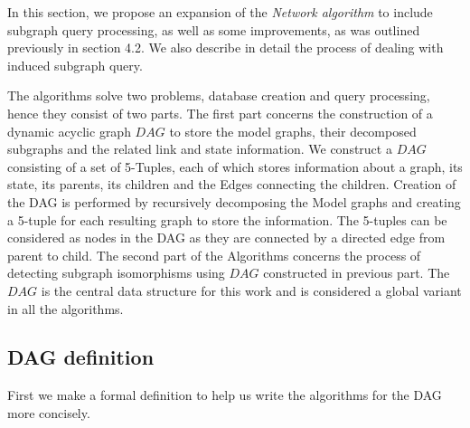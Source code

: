In this section, we propose an expansion of the \textit{Network algorithm} to include subgraph query processing, as well as some improvements, as was outlined previously in section 4.2. We also describe in detail the process of dealing with induced subgraph query.


The algorithms solve two problems, database creation and query processing, hence they consist of two parts. The first part concerns the construction of a dynamic acyclic graph $DAG$ to store the model graphs, their decomposed subgraphs and the related link and state information. We construct a $DAG$ consisting of a set of 5-Tuples, each of which  stores information about a graph, its state, its parents, its children and the Edges connecting the children. Creation of the DAG is performed by recursively decomposing the Model graphs and creating a 5-tuple for each resulting graph to store the information. The 5-tuples can be considered as nodes in the DAG as they are connected by a directed edge from parent to child.
The second part of the Algorithms concerns the process of detecting subgraph isomorphisms using $DAG$ constructed in previous part. 
The $DAG$ is the central data structure for this work and is considered  a global variant in all the algorithms. 

\subsection{DAG definition}
First we make a formal definition to help us write the algorithms for the DAG more concisely.


